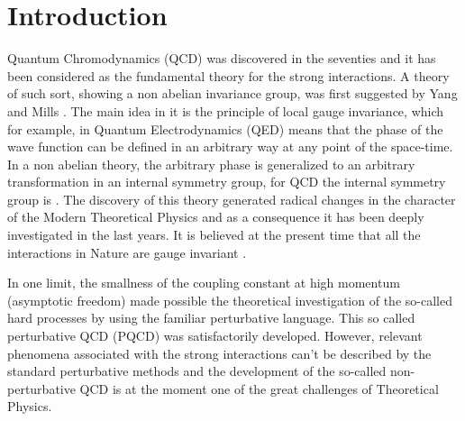 \documentclass[12pt,letterpaper]{report}
\begin{document}
\tableofcontents

\chapter{Introduction}

Quantum Chromodynamics (QCD) was discovered in the seventies and
it has been considered as the fundamental theory for the strong
interactions. A theory of such sort, showing a non abelian
invariance group, was first suggested by Yang and Mills
\cite{Yang}. The main idea in it is the principle of local gauge
invariance, which for example, in Quantum Electrodynamics (QED)
means that the phase of the wave function can be defined in an
arbitrary way at any point of the space-time. In a non abelian
theory, the arbitrary phase is generalized to an arbitrary
transformation in an internal symmetry group, for QCD the internal
symmetry group is \coordHE{}. The discovery of this theory generated
radical changes in the character of the Modern Theoretical Physics
and as a consequence it has been deeply investigated in the last
years. It is believed at the present time that all the
interactions in Nature are gauge invariant \cite{Green}.

In one limit, the smallness of the coupling constant at high
momentum (asymptotic freedom) made possible the theoretical
investigation of the so-called hard processes by using the
familiar perturbative language. This so called perturbative QCD
(PQCD) was satisfactorily developed. However, relevant phenomena
associated with the strong interactions can't be described by the
standard perturbative methods and the development of the so-called
non-perturbative QCD is at the moment one of the great challenges
of Theoretical Physics.
\end{document}

